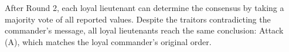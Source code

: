 \par\vspace{0.3em}
{\scriptsize
After Round 2, each loyal lieutenant can determine the consensus by taking a majority vote of all reported values. Despite the traitors contradicting the commander's message, all loyal lieutenants reach the same conclusion: Attack (A), which matches the loyal commander's original order.
}
